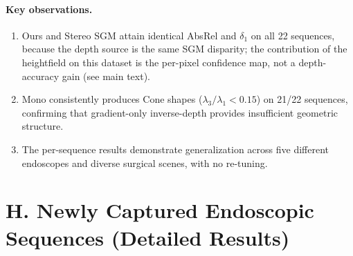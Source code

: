\documentclass[review]{elsarticle}
\begin{document}
\begin{table}[h]
\end{table}

\paragraph{Key observations.}
\begin{enumerate}[noitemsep]
    \item Ours and Stereo SGM attain identical AbsRel and $\delta_1$ on all 22 sequences, because the depth source is the same SGM disparity; the contribution of the heightfield on this dataset is the per-pixel confidence map, not a depth-accuracy gain (see main text).
    \item Mono consistently produces Cone shapes ($\lambda_3/\lambda_1 < 0.15$) on 21/22 sequences, confirming that gradient-only inverse-depth provides insufficient geometric structure.
    \item The per-sequence results demonstrate generalization across five different endoscopes and diverse surgical scenes, with no re-tuning.
\end{enumerate}

\section*{H. Newly Captured Endoscopic Sequences (Detailed Results)}
\end{document}
